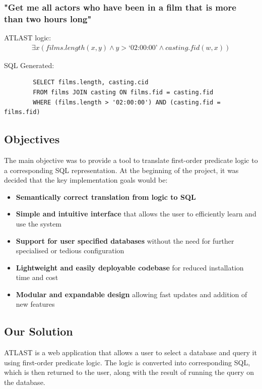 \documentclass[a4paper, 11pt]{article}
\begin{document}
    \subsubsection*{"Get me all actors who have been in a film that is more
      than two hours long"}

      ATLAST logic:
      \begin{gather}
        \exists x(films.length(x, y) \land y > \text{`02:00:00'} \land
          casting.fid(w, x))
      \end{gather}

      SQL Generated:
      \begin{verbatim}
        SELECT films.length, casting.cid
        FROM films JOIN casting ON films.fid = casting.fid
        WHERE (films.length > '02:00:00') AND (casting.fid = films.fid)
      \end{verbatim}

  \subsection{Objectives}
    The main objective was to provide a tool to translate first-order predicate
    logic to a corresponding SQL representation. At the beginning of the
    project, it was decided that the key implementation goals would be:

    \begin{itemize}
      \item \textbf{Semantically correct translation from logic to SQL}

      \item \textbf{Simple and intuitive interface} that allows the user to
      efficiently learn and use the system

      \item \textbf{Support for user specified databases} without the need for
      further specialised or tedious configuration

      \item \textbf{Lightweight and easily deployable codebase} for reduced
      installation time and cost

      \item \textbf{Modular and expandable design} allowing fast updates and
      addition of new features
    \end{itemize}

  \subsection{Our Solution}
    ATLAST is a web application that allows a user to select a database
    and query it using first-order predicate logic. The logic is converted
    into corresponding SQL, which is then returned to the user, along with the
    result of running the query on the database.
\end{document}
